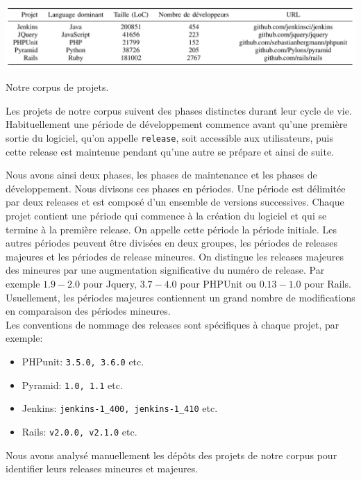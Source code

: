 \begin{table}[h]
	\centering
	\includegraphics[scale=0.204]{data/tables/VCS.png}
	\caption{Notre corpus de projets.}
	\label{tab:vcs}
\end{table}

Les projets de notre corpus suivent des phases distinctes durant leur cycle de vie. Habituellement une période de développement commence avant qu'une première sortie du logiciel, qu'on appelle \texttt{release}, soit accessible aux utilisateurs, puis cette release est maintenue pendant qu'une autre se prépare et ainsi de suite.

Nous avons ainsi deux phases, les phases de maintenance et les phases de développement. Nous divisons ces phases en périodes. Une période est délimitée par deux releases et est composé d'un ensemble de versions successives. Chaque projet contient une période qui commence à la création du logiciel et qui se termine à la première release. On appelle cette période la période initiale. Les autres périodes peuvent être divisées en deux groupes, les périodes de releases majeures et les périodes de release mineures. On distingue les releases majeures des mineures par une augmentation significative du numéro de release. Par exemple $1.9-2.0$ pour Jquery, $3.7-4.0$ pour PHPUnit ou $0.13-1.0$ pour Rails. Usuellement, les périodes majeures contiennent un grand nombre de modifications en comparaison des périodes mineures.\\

Les conventions de nommage des releases sont spécifiques à chaque projet, par exemple:
\begin{itemize}
\item PHPunit: \texttt{3.5.0, 3.6.0} etc.
\item Pyramid: \texttt{1.0, 1.1} etc.
\item Jenkins: \texttt{jenkins-1\_400, jenkins-1\_410} etc.
\item Rails: \texttt{v2.0.0, v2.1.0} etc.
\end{itemize}
Nous avons analysé manuellement les dépôts des projets de notre corpus pour identifier leurs releases mineures et majeures.\\


